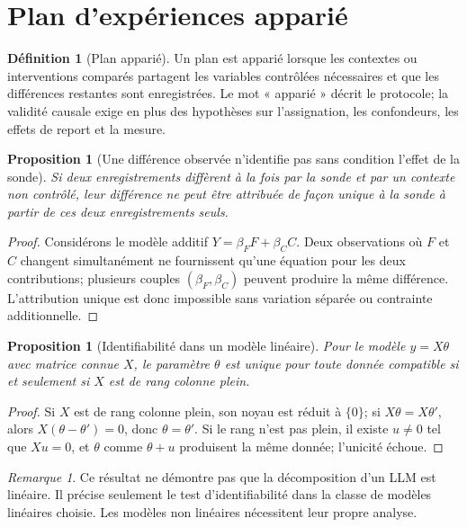 \documentclass[11pt,oneside]{book}
\newtheorem{proposition}[theoreme]{Proposition}
\theoremstyle{definition}\newtheorem{definition}[theoreme]{Définition}\newtheorem{hypothese}[theoreme]{Hypothèse explicite}\newtheorem{convention}[theoreme]{Convention}\newtheorem{critere}[theoreme]{Critère}
\theoremstyle{remark}\newtheorem{remarque}[theoreme]{Remarque}\newtheorem{contreexemple}[theoreme]{Contre-exemple}
\begin{document}
\section{Plan d'expériences apparié}
\begin{definition}[Plan apparié]
Un plan est apparié lorsque les contextes ou interventions comparés partagent les variables contrôlées nécessaires et que les différences restantes sont enregistrées. Le mot « apparié » décrit le protocole; la validité causale exige en plus des hypothèses sur l'assignation, les confondeurs, les effets de report et la mesure.
\end{definition}
\begin{proposition}[Une différence observée n'identifie pas sans condition l'effet de la sonde]
Si deux enregistrements diffèrent à la fois par la sonde et par un contexte non contrôlé, leur différence ne peut être attribuée de façon unique à la sonde à partir de ces deux enregistrements seuls.
\end{proposition}
\begin{proof}
Considérons le modèle additif \(Y=\beta_F F+\beta_C C\). Deux observations où \(F\) et \(C\) changent simultanément ne fournissent qu'une équation pour les deux contributions; plusieurs couples \((\beta_F,\beta_C)\) peuvent produire la même différence. L'attribution unique est donc impossible sans variation séparée ou contrainte additionnelle.\end{proof}
\begin{proposition}[Identifiabilité dans un modèle linéaire]
Pour le modèle \(y=X\theta\) avec matrice connue \(X\), le paramètre \(\theta\) est unique pour toute donnée compatible si et seulement si \(X\) est de rang colonne plein.
\end{proposition}
\begin{proof}
Si \(X\) est de rang colonne plein, son noyau est réduit à \(\{0\}\); si \(X\theta=X\theta'\), alors \(X(\theta-\theta')=0\), donc \(\theta=\theta'\). Si le rang n'est pas plein, il existe \(u\ne0\) tel que \(Xu=0\), et \(\theta\) comme \(\theta+u\) produisent la même donnée; l'unicité échoue.\end{proof}
\begin{remarque}
Ce résultat ne démontre pas que la décomposition d'un LLM est linéaire. Il précise seulement le test d'identifiabilité dans la classe de modèles linéaires choisie. Les modèles non linéaires nécessitent leur propre analyse.
\end{remarque}
\end{document}
